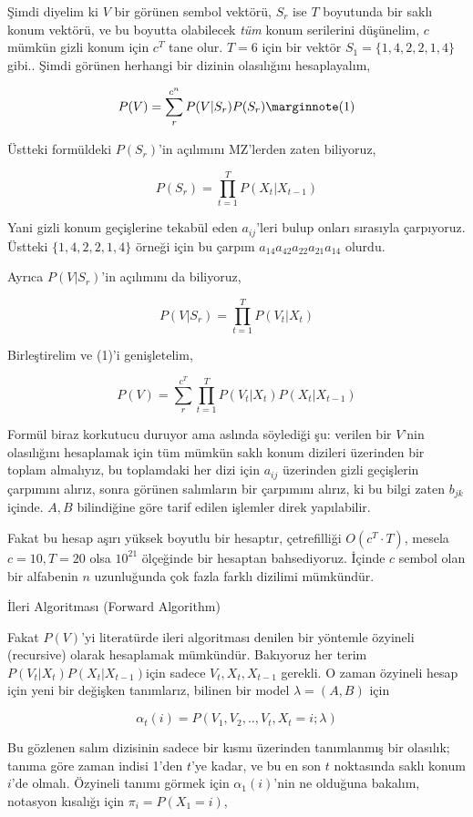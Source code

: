 \documentclass[12pt,fleqn]{article}\usepackage{../../common}
\begin{document}
Şimdi diyelim ki $V$ bir görünen sembol vektörü, $S_r$ ise $T$ boyutunda
bir saklı konum vektörü, ve bu boyutta olabilecek {\em tüm} konum
serilerini düşünelim, $c$ mümkün gizli konum için $c^T$ tane olur. $T=6$
için bir vektör $S_1 = \{1,4,2,2,1,4\}$ gibi.. Şimdi görünen herhangi bir
dizinin olasılığını hesaplayalım,

$$ P(V) = \sum _{r}^{c^n} P(V | S_r) P(S_r) 
\mlabel{1}
$$

Üstteki formüldeki $P(S_r)$'in açılımını MZ'lerden zaten biliyoruz, 

$$ P(S_r) = \prod _{t=1}^{T}P(X_t|X_{t-1}) $$

Yani gizli konum geçişlerine tekabül eden $a_{ij}$'leri bulup onları
sırasıyla çarpıyoruz. Üstteki $\{1,4,2,2,1,4\}$ örneği için bu
çarpım $a_{14}a_{42}a_{22}a_{21}a_{14}$ olurdu. 

Ayrıca $P(V|S_r)$'in açılımını da biliyoruz, 

$$ P(V|S_r) = \prod _{t=1}^{T} P(V_t | X_t) $$

Birleştirelim ve (1)'i genişletelim,

$$ 
P(V) = \sum _{r}^{c^T} \prod _{t=1}^{T} P(V_t | X_t)  P(X_t|X_{t-1}) 
$$

Formül biraz korkutucu duruyor ama aslında söylediği şu: verilen bir
$V$'nin olasılığını hesaplamak için tüm mümkün saklı konum dizileri
üzerinden bir toplam almalıyız, bu toplamdaki her dizi için $a_{ij}$
üzerinden gizli geçişlerin çarpımını alırız, sonra görünen salımların bir
çarpımını alırız, ki bu bilgi zaten $b_{jk}$ içinde. $A,B$ bilindiğine göre
tarif edilen işlemler direk yapılabilir.

Fakat bu hesap aşırı yüksek boyutlu bir hesaptır, çetrefilliği $O(c^T \cdot T)$, 
mesela $c=10,T=20$ olsa $10^{21}$ ölçeğinde bir hesaptan bahsediyoruz.
İçinde $c$ sembol olan bir alfabenin $n$ uzunluğunda çok fazla farklı dizilimi
mümkündür. 

İleri Algoritması (Forward Algorithm)

Fakat $P(V)$'yi literatürde ileri algoritması denilen bir yöntemle özyineli
(recursive) olarak hesaplamak mümkündür. Bakıyoruz her terim $P(V_t | X_t)
P(X_t|X_{t-1}) $için sadece $V_t,X_t,X_{t-1}$ gerekli. O zaman özyineli
hesap için  yeni bir  değişken tanımlarız, bilinen bir model 
$\lambda = (A,B)$ için

$$ \alpha_t(i) = P(V_1,V_2,..,V_t, X_t = i; \lambda) $$

Bu gözlenen salım dizisinin sadece bir kısmı üzerinden tanımlanmış bir
olasılık; tanıma göre zaman indisi 1'den $t$'ye kadar, ve bu en son $t$
noktasında saklı konum $i$'de olmalı. Özyineli tanımı görmek için
$\alpha_1(i)$'nin ne olduğuna bakalım, notasyon kısalığı için 
$\pi_i = P(X_1 = i)$,
\end{document}
